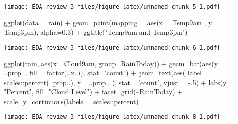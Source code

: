 \documentclass[
]{article}
\newenvironment{Shaded}{\begin{snugshade}}{\end{snugshade}}
\newcommand{\AttributeTok}[1]{\textcolor[rgb]{0.77,0.63,0.00}{#1}}
\newcommand{\DecValTok}[1]{\textcolor[rgb]{0.00,0.00,0.81}{#1}}
\newcommand{\FloatTok}[1]{\textcolor[rgb]{0.00,0.00,0.81}{#1}}
\newcommand{\FunctionTok}[1]{\textcolor[rgb]{0.00,0.00,0.00}{#1}}
\newcommand{\NormalTok}[1]{#1}
\newcommand{\SpecialCharTok}[1]{\textcolor[rgb]{0.00,0.00,0.00}{#1}}
\newcommand{\StringTok}[1]{\textcolor[rgb]{0.31,0.60,0.02}{#1}}
\begin{document}
\texttt{[image: EDA\_review-3\_files/figure-latex/unnamed-chunk-5-1.pdf]}

\begin{Shaded}
\begin{Highlighting}[]
\FunctionTok{ggplot}\NormalTok{(}\AttributeTok{data =}\NormalTok{ rain) }\SpecialCharTok{+}
  \FunctionTok{geom\_point}\NormalTok{(}\AttributeTok{mapping =} \FunctionTok{aes}\NormalTok{(}\AttributeTok{x =}\NormalTok{ Temp9am , }\AttributeTok{y =}\NormalTok{ Temp3pm), }\AttributeTok{alpha=}\FloatTok{0.3}\NormalTok{) }\SpecialCharTok{+}
\FunctionTok{ggtitle}\NormalTok{(}\StringTok{"Temp9am and Temp3pm"}\NormalTok{)}
\end{Highlighting}
\end{Shaded}

\texttt{[image: EDA\_review-3\_files/figure-latex/unnamed-chunk-6-1.pdf]}

\begin{Shaded}
\begin{Highlighting}[]
\FunctionTok{ggplot}\NormalTok{(rain, }\FunctionTok{aes}\NormalTok{(}\AttributeTok{x=}\NormalTok{ Cloud9am,  }\AttributeTok{group=}\NormalTok{RainToday)) }\SpecialCharTok{+} 
    \FunctionTok{geom\_bar}\NormalTok{(}\FunctionTok{aes}\NormalTok{(}\AttributeTok{y =}\NormalTok{ ..prop.., }\AttributeTok{fill =} \FunctionTok{factor}\NormalTok{(..x..)), }\AttributeTok{stat=}\StringTok{"count"}\NormalTok{) }\SpecialCharTok{+}
    \FunctionTok{geom\_text}\NormalTok{(}\FunctionTok{aes}\NormalTok{( }\AttributeTok{label =}\NormalTok{ scales}\SpecialCharTok{::}\FunctionTok{percent}\NormalTok{(..prop..),}
                   \AttributeTok{y=}\NormalTok{ ..prop.. ), }\AttributeTok{stat=} \StringTok{"count"}\NormalTok{, }\AttributeTok{vjust =} \SpecialCharTok{{-}}\NormalTok{.}\DecValTok{5}\NormalTok{) }\SpecialCharTok{+}
    \FunctionTok{labs}\NormalTok{(}\AttributeTok{y =} \StringTok{"Percent"}\NormalTok{, }\AttributeTok{fill=}\StringTok{"Cloud Level"}\NormalTok{) }\SpecialCharTok{+}
    \FunctionTok{facet\_grid}\NormalTok{(}\SpecialCharTok{\textasciitilde{}}\NormalTok{RainToday) }\SpecialCharTok{+}
    \FunctionTok{scale\_y\_continuous}\NormalTok{(}\AttributeTok{labels =}\NormalTok{ scales}\SpecialCharTok{::}\NormalTok{percent)}
\end{Highlighting}
\end{Shaded}

\texttt{[image: EDA\_review-3\_files/figure-latex/unnamed-chunk-8-1.pdf]}
\end{document}
